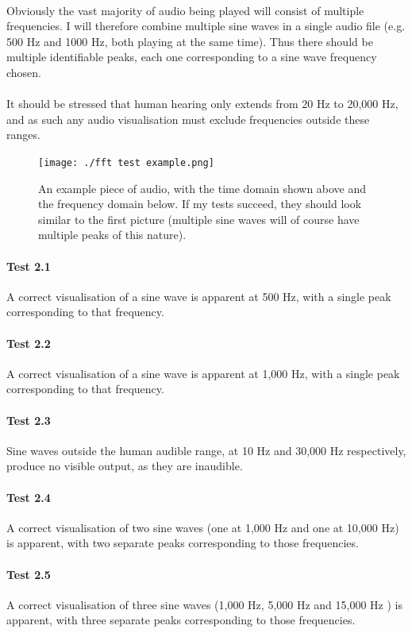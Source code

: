 \paragraph{}
Obviously the vast majority of audio being played will consist of multiple frequencies. I will therefore combine multiple sine waves in a single audio file (e.g. 500 Hz and 1000 Hz, both playing at the same time). Thus there should be multiple identifiable peaks, each one corresponding to a sine wave frequency chosen.

\paragraph{}
It should be stressed that human hearing only extends from 20 Hz to 20,000 Hz, and as such any audio visualisation must exclude frequencies outside these ranges.

\begin{figure}[H]
	\texttt{[image: ./fft test example.png]}
	\caption{An example piece of audio, with the time domain shown above and the frequency domain below. If my tests succeed, they should look similar to the first picture (multiple sine waves will of course have multiple peaks of this nature). }
\end{figure}

\begin{multicols}{2}
\paragraph{Test 2.1} A correct visualisation of a sine wave is apparent at 500 Hz, with a single peak corresponding to that frequency.
\paragraph{Test 2.2} A correct visualisation of a sine wave is apparent at 1,000 Hz, with a single peak corresponding to that frequency.
\paragraph{Test 2.3} Sine waves outside the human audible range, at 10 Hz and 30,000 Hz respectively, produce no visible output, as they are inaudible.
\paragraph{Test 2.4} A correct visualisation of two sine waves (one at 1,000 Hz and one at 10,000 Hz) is apparent, with two separate peaks corresponding to those frequencies.
\paragraph{Test 2.5} A correct visualisation of three sine waves (1,000 Hz, 5,000 Hz and 15,000 Hz ) is apparent, with three separate peaks corresponding to those frequencies.
\end{multicols}

